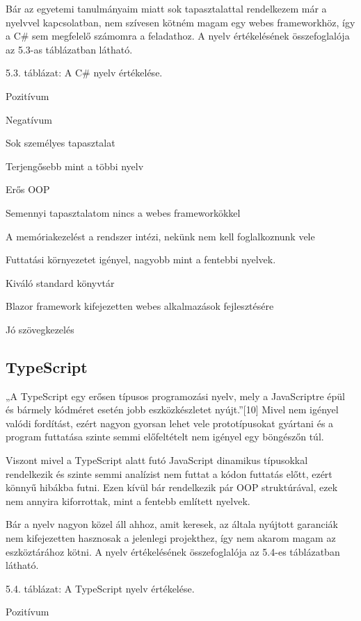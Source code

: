 Bár az egyetemi tanulmányaim miatt sok tapasztalattal rendelkezem már a nyelvvel kapcsolatban, nem szívesen kötném magam egy webes frameworkhöz, így a C\# sem megfelelő számomra a feladathoz. A nyelv értékelésének összefoglalója az 5.3-as táblázatban látható.

5.3. táblázat: A C\# nyelv értékelése.

Pozitívum

Negatívum

Sok személyes tapasztalat

Terjengősebb mint a többi nyelv

Erős OOP

Semennyi tapasztalatom nincs a webes frameworkökkel

A memóriakezelést a rendszer intézi, nekünk nem kell foglalkoznunk vele

Futtatási környezetet igényel, nagyobb mint a fentebbi nyelvek.

Kiváló standard könyvtár



Blazor framework kifejezetten webes alkalmazások fejlesztésére



Jó szövegkezelés

\subsection{TypeScript}

„A TypeScript egy erősen típusos programozási nyelv, mely a JavaScriptre épül és bármely kódméret esetén jobb eszközkészletet nyújt.”[10] Mivel nem igényel valódi fordítást, ezért nagyon gyorsan lehet vele prototípusokat gyártani és a program futtatása szinte semmi előfeltételt nem igényel egy böngészőn túl.

Viszont mivel a TypeScript alatt futó JavaScript dinamikus típusokkal rendelkezik és szinte semmi analízist nem futtat a kódon futtatás előtt, ezért könnyű hibákba futni. Ezen kívül bár rendelkezik pár OOP struktúrával, ezek nem annyira kiforrottak, mint a fentebb említett nyelvek.

Bár a nyelv nagyon közel áll ahhoz, amit keresek, az általa nyújtott garanciák nem kifejezetten hasznosak a jelenlegi projekthez, így nem akarom magam az eszköztárához kötni. A nyelv értékelésének összefoglalója az 5.4-es táblázatban látható.

5.4. táblázat: A TypeScript nyelv értékelése.

Pozitívum

